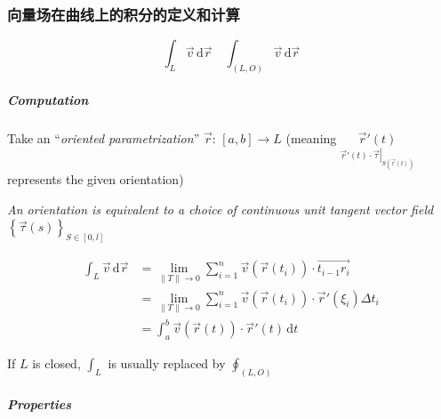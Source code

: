 \subsubsection{向量场在曲线上的积分的定义和计算}


$$\int_L\overrightarrow{v}\,\mathrm{d}\overrightarrow{r}\quad\int_{(L,O)}\overrightarrow{v}\,\mathrm{d}\overrightarrow{r}$$

\subparagraph*{Computation}

Take an ``\emph{oriented parametrization}'' $\overrightarrow{r}:\,[a,b]\to L$ (meaning $\underset{\overrightarrow{r}'(t)\cdot\left.\overrightarrow{\tau}\right|_{S\left(\overrightarrow{r}(t)\right)}}{\overrightarrow{r}'(t)}$ represents the given orientation)

\emph{An orientation is equivalent to a choice of continuous unit tangent vector field $\left\{\overrightarrow{\tau}(s)\right\}_{S\in[0,l]}$}

\begin{align*}
    \int_L\overrightarrow{v}\,\mathrm{d}\overrightarrow{r}
     & =\lim_{\|T\|\to 0}\sum_{i=1}^n\overrightarrow{v}\left(\overrightarrow{r}(t_i)\right)\cdot\overrightarrow{t_{i-1}r_i}          \\
     & =\lim_{\|T\|\to 0}\sum_{i=1}^n\overrightarrow{v}\left(\overrightarrow{r}(t_i)\right)\cdot\overrightarrow{r}'(\xi_i)\Delta t_i \\
     & =\int_a^b\overrightarrow{v}\left(\overrightarrow{r}(t)\right)\cdot\overrightarrow{r}'(t)\,\mathrm{d}t
\end{align*}

\begin{remark}
    If $L$ is closed, $\displaystyle\int_L$ is usually replaced by $\displaystyle\oint_{(L,O)}$
\end{remark}

\subparagraph*{Properties}

